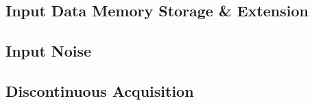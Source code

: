 \subsection{Input Data Memory Storage \& Extension}\label{2_3_1_memory}


\subsection{Input Noise}\label{2_3_1_noise}


\subsection{Discontinuous Acquisition}\label{2_3_1_discon_acq}

